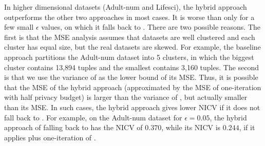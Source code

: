 In higher dimensional datasets (Adult-num and Lifesci), the hybrid approach outperforms the other two approaches in most cases. It is worse than \dpl only for a few small $\epsilon$ values, on which it falls back to \eugkm. There are two possible reasons. The first is that the MSE analysis assumes that datasets are well clustered and each cluster has equal size, but the real datasets are skewed. For example, the baseline approach partitions the Adult-num dataset into 5 clusters, in which the biggest cluster contains 13,894 tuples and the smallest contains 3,160 tuples. The second is that we use the variance of \eugkm as the lower bound of its MSE. Thus, it is possible that the MSE of the hybrid approach (approximated by the MSE of one-iteration \dpl with half privacy budget) is larger than the variance of \eugkm, but actually smaller than its MSE. In such cases, the hybrid approach gives lower NICV if it does not fall back to \eugkm. For example, on the Adult-num dataset for $\epsilon=0.05$, the hybrid approach of falling back to \eugkm has the NICV of $0.370$, while its NICV is $0.244$, if it applies \eugkm plus one-iteration of \dpl.



\begin{comment}
In this section we experimentally compare the two non-interactive algorithms UGkM and AUGkM, the hybrid approach, and the \dpl.  Figure \ref{fig:hybrid} reports the results.  The Hybrid approach always outperforms the existing non-interactive algorithms and interactive algorithms over all datasets.  The advantage of it is more significant in the two high dimensional datasets, Adult-num and Lifesci.  Observe that the Hybrid approach has same performance as the AUGkM in the S1 dataset.  The reason is that the two-phase hybrid approach cannot improve the AUGkM result.  So we use one-phase hybrid approach, that is running AUGkM only.

In addition, we can see that AUGkM generally outperforms UGkM in all datasets.  The difference is significant When $\epsilon$ is very small.  They generally converge to close NICV values when $\epsilon$ becomes large.  This seems to suggest that they are reaching the limit of what non-interactive methods can do.  Also, UGkM and AUGkM can never converge to the baseline, as the non-interactive methods have some inherent noises due to the partitioning.  On the other hand, the two non-interactive approaches is superior to the \dpl in the four low dimension datasets.  But \dpl outperformed them in two high dimension datasets, Adult-num and Lifesci.  Therefore, the limits of the non-interactive approaches and the strength of \dpl in high dimension datasets motive the hybrid approach.
\end{comment}

















